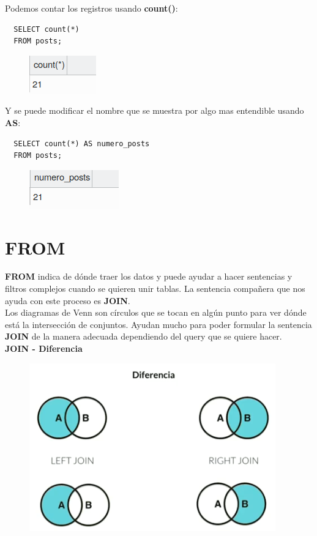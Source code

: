 \documentclass{article}
\begin{document}
Podemos contar los registros usando \textbf{count()}:
\begin{verbatim}
  SELECT count(*)
  FROM posts;
\end{verbatim}
\begin{figure}[h!]
  \centering
  \includegraphics[scale=0.75]{./Pictures/082_select_count.png}
\end{figure}


Y se puede modificar el nombre que se muestra por algo mas entendible usando
\textbf{AS}:
\begin{verbatim}
  SELECT count(*) AS numero_posts
  FROM posts;
\end{verbatim}
\begin{figure}[h!]
  \centering
  \includegraphics[scale=0.75]{./Pictures/083_select_count_as.png}
\end{figure}


\section{FROM}%
\textbf{FROM} indica de dónde traer los datos y puede ayudar a hacer sentencias
y filtros complejos cuando se quieren unir tablas. La sentencia compañera que
nos ayuda con este proceso es \textbf{JOIN}.\\

Los diagramas de Venn son círculos que se tocan en algún punto para ver dónde
está la intersección de conjuntos. Ayudan mucho para poder formular la
sentencia \textbf{JOIN} de la manera adecuada dependiendo del query que se
quiere hacer.\\

\textbf{JOIN - Diferencia}\\
\begin{figure}[h!]
  \centering
  \includegraphics[scale=0.75]{./Pictures/084_join_diferencia.png}
\end{figure}
\end{document}
